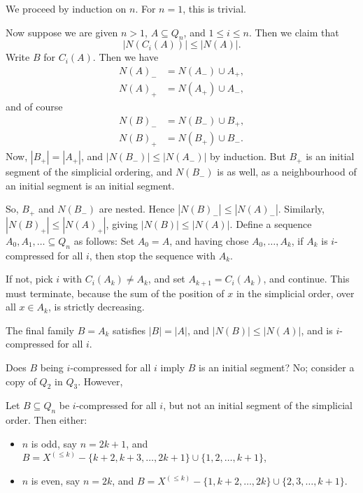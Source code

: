 \documentclass[12pt]{article}
\begin{document}
\begin{proofbox}
	We proceed by induction on $n$. For $n = 1$, this is trivial.

	Now suppose we are given $n > 1$, $A \subseteq Q_n$, and $1 \leq i \leq n$. Then we claim that
	\[
	|N(C_i(A))| \leq |N(A)|.
	\]
	Write $B$ for $C_i(A)$. Then we have
	\begin{align*}
		N(A)_{-} &= N(A_{-}) \cup A_+, \\
		N(A)_+ &= N(A_+) \cup A_-,
	\end{align*}
	and of course
	\begin{align*}
		N(B)_- &= N(B_-) \cup B_+, \\
		N(B)_+ &= N(B_+) \cup B_-.
	\end{align*}
	Now, $|B_+| = |A_+|$, and $|N(B_-)| \leq |N(A_-)|$ by induction. But $B_+$ is an initial segment of the simplicial ordering, and $N(B_-)$ is as well, as a neighbourhood of an initial segment is an initial segment.

	So, $B_+$ and $N(B_-)$ are nested. Hence $|N(B)_-| \leq |N(A)_-|$. Similarly, $|N(B)_+| \leq |N(A)_+|$, giving $|N(B)| \leq |N(A)|$.
	Define a sequence $A_0, A_1, \ldots \subseteq Q_n$ as follows: Set $A_0 = A$, and having chose $A_0, \ldots, A_k$, if $A_k$ is $i$-compressed for all $i$, then stop the sequence with $A_k$.

	If not, pick $i$ with $C_i(A_k) \neq A_k$, and set $A_{k+1} = C_i(A_k)$, and continue. This must terminate, because the sum of the position of $x$ in the simplicial order, over all $x \in A_k$, is strictly decreasing.

	The final family $B = A_k$ satisfies $|B| = |A|$, and $|N(B)| \leq |N(A)|$, and is $i$-compressed for all $i$. 
\end{proofbox}

Does $B$ being $i$-compressed for all $i$ imply $B$ is an initial segment? No; consider a copy of $Q_2$ in $Q_3$. However,

\begin{lemma}
	Let $B \subseteq Q_n$ be $i$-compressed for all $i$, but not an initial segment of the simplicial order. Then either:
	\begin{itemize}
		\item $n$ is odd, say $n = 2k + 1$, and $B = X^{(\leq k)} - \{k+2, k+3, \ldots, 2k+1\} \cup \{1, 2, \ldots, k+1\}$,
	\item $n$ is even, say $n = 2k$, and $B = X^{(\leq k)} - \{1, k+2, \ldots, 2k\} \cup \{2, 3, \ldots, k+1\}$.
	\end{itemize}
\end{lemma}
\end{document}
